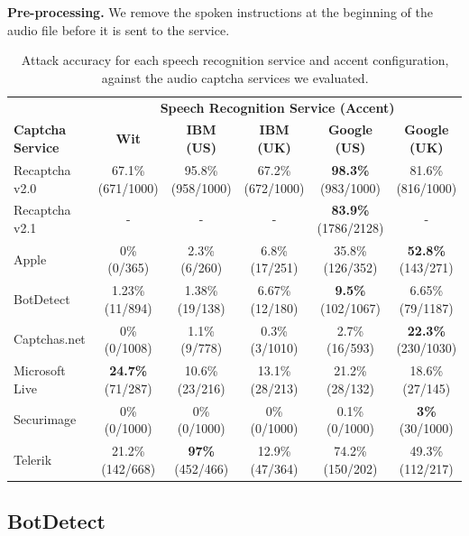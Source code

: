 
\textbf{Pre-processing.} We remove the spoken instructions at the beginning of the audio file
before it is sent to the service.

\begin{table}[t]
\centering
\caption{Attack accuracy for each speech recognition service and accent configuration, against the audio captcha services we evaluated.}
\begin{tabular}{lccccc}
\toprule
&\multicolumn{5}{c}{\textbf{Speech Recognition Service (Accent)}}\\
\cmidrule{2-6}
\textbf{Captcha Service}& \textbf{Wit}& \textbf{IBM (US)} & \textbf{ IBM (UK)} & \textbf{Google (US)} & \textbf{Google (UK)} \\
\hline
Recaptcha v2.0 & 67.1\% (671/1000) & 95.8\% (958/1000) & 67.2\% (672/1000) & \textbf{98.3\%} (983/1000) & 81.6\% (816/1000) \\
\rowcolor{Gray}
Recaptcha v2.1 & -  & - & -  & \textbf{83.9\%} (1786/2128) & - \\
Apple  & 0\% (0/365)  & 2.3\% (6/260) & 6.8\% (17/251) & 35.8\% (126/352) & \textbf{52.8\%} (143/271) \\
\rowcolor{Gray}
BotDetect  & 1.23\% (11/894)  & 1.38\% (19/138) & 6.67\% (12/180) & \textbf{9.5\%} (102/1067)  & 6.65\% (79/1187) \\
Captchas.net  & 0\% (0/1008) & 1.1\% (9/778)  & 0.3\% (3/1010)  & 2.7\% (16/593) & \textbf{22.3\%} (230/1030) \\
\rowcolor{Gray}
Microsoft Live & \textbf{24.7\%} (71/287) & 10.6\% (23/216)  & 13.1\% (28/213)  & 21.2\% (28/132)  & 18.6\% (27/145) \\
Securimage  & 0\% (0/1000)  & 0\% (0/1000) & 0\% (0/1000) & 0.1\% (0/1000) & \textbf{3\%} (30/1000) \\
\rowcolor{Gray}
Telerik  & 21.2\% (142/668)  & \textbf{97\%} (452/466) & 12.9\% (47/364) & 74.2\% (150/202) & 49.3\% (112/217) \\
\bottomrule
\end{tabular}
\label{tab:combinations}
\end{table}


\subsection{BotDetect}


